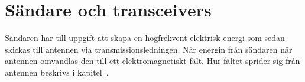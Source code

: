 \chapter[Sändare]{Sändare och transceivers}
\label{ch:saendare}
\label{ch:transceiver}

Sändaren har till uppgift att skapa en högfrekvent elektrisk energi som sedan
skickas till antennen via transmissionsledningen.
När energin från sändaren når antennen omvandlas den till ett elektromagnetiskt
fält.
Hur fältet sprider sig från antennen beskrivs i
kapitel~.